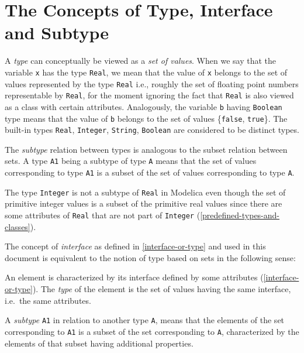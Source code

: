 \section{The Concepts of Type, Interface and Subtype}\label{the-concepts-of-type-interface-and-subtype}

A \emph{type} can conceptually be viewed as a \emph{set of values}. When
we say that the variable \lstinline!x! has the type \lstinline!Real!, we mean that the value of
\lstinline!x! belongs to the set of values represented by the type \lstinline!Real! i.e.,
roughly the set of floating point numbers representable by \lstinline!Real!, for the
moment ignoring the fact that \lstinline!Real! is also viewed as a class with
certain attributes. Analogously, the variable \lstinline!b! having \lstinline!Boolean! type
means that the value of \lstinline!b! belongs to the set of values \{\lstinline!false!, \lstinline!true!\}.
The built-in types \lstinline!Real!, \lstinline!Integer!, \lstinline!String!,
\lstinline!Boolean! are considered to be
distinct types.

The \emph{subtype} relation between types is analogous to the subset
relation between sets. A type \lstinline!A1! being a subtype of type \lstinline!A! means that
the set of values corresponding to type \lstinline!A1! is a subset of the set of
values corresponding to type \lstinline!A!.

The type \lstinline!Integer! is not a subtype of \lstinline!Real! in Modelica even though the
set of primitive integer values is a subset of the primitive real values
since there are some attributes of \lstinline!Real! that are not part of \lstinline!Integer!
(\cref{predefined-types-and-classes}).

The concept of \emph{interface} as defined in \cref{interface-or-type} and used in
this document is equivalent to the notion of type based on sets in the
following sense:

An element is characterized by its interface defined by some attributes
(\cref{interface-or-type}). The \emph{type} of the element is the set of values
having the same interface, i.e.\ the same attributes.

A \emph{subtype} \lstinline!A1! in relation to another type \lstinline!A!, means that the
elements of the set corresponding to \lstinline!A1! is a subset of the set
corresponding to \lstinline!A!, characterized by the elements of that subset having
additional properties.

